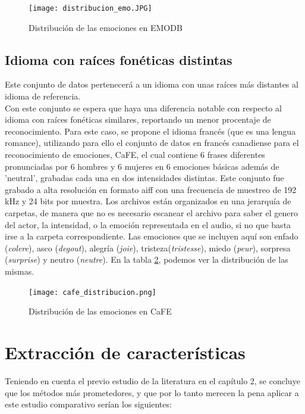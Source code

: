 \documentclass[11pt,a4paper,spanish]{book}
\begin{document}
	\begin{figure}[H]
		\centering
		\texttt{[image: distribucion\_emo.JPG]} 
		\caption{Distribución de las emociones en EMODB}
		\label{fig:emociones_emodb}
	\end{figure}
	

	\subsection{Idioma con raíces fonéticas distintas} Este conjunto de datos pertenecerá a un idioma con unas raíces más distantes al idioma de referencia.\\
	Con este conjunto se espera que haya una diferencia notable con respecto al idioma con raíces fonéticas similares, reportando un menor procentaje de reconocimiento. Para este caso, se propone el idioma francés (que es una lengua romance), utilizando para ello el conjunto de datos en francés canadiense para el reconocimiento de emociones, CaFE, el cual contiene 6 frases diferentes pronunciadas por 6 hombres y 6 mujeres en 6 emociones básicas además de 'neutral', grabadas cada una en dos intensidades distintas. Este conjunto fue grabado a alta resolución en formato aiff con una frecuencia de muestreo de 192 kHz  y 24 bits por muestra.
	Los archivos están organizados en una jerarquía de carpetas, de manera que no es necesario escanear el archivo para saber el genero del actor, la intensidad, o la emoción representada en el audio, si no que basta irse a la carpeta correspondiente.
	Las emociones que se incluyen aquí son enfado (\emph{colere}), asco (\emph{degout}), alegría (\emph{joie}), tristeza(\emph{tristesse}), miedo (\emph{peur}), sorpresa (\emph{surprise}) y neutro (\emph{neutre}). En la tabla \ref{fig:emociones_cafe}, podemos ver la distribución de las mismas.
	
	
	\begin{figure}[H]
		\centering
		\texttt{[image: cafe\_distribucion.png]} 
		\caption{Distribución de las emociones en CaFE}
		\label{fig:emociones_cafe}
	\end{figure}
	
	
	
	\section{Extracción de características}
	\label{sec:extraccion_cap4}
	Teniendo en cuenta el previo estudio de la literatura en el capítulo 2, se concluye que los métodos más prometedores, y que por lo tanto merecen la pena aplicar a este estudio comparativo serían los siguientes:
\end{document}
